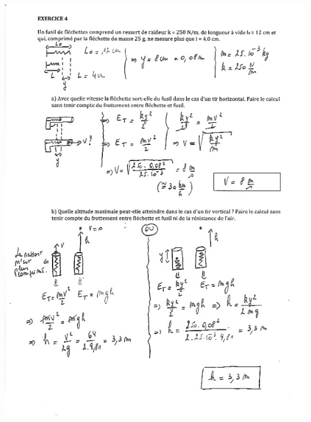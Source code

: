 \includegraphics[width=17.498cm,height=23.941cm]{Pictures/100000010000026400000345A27521696B730F2D.png}

